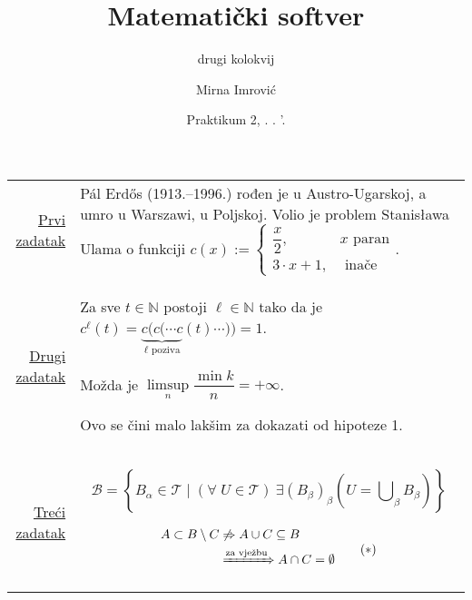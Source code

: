 \documentclass[10pt]{scrartcl}
\begin{document}


\renewcommand{\today}{\the\day. \MakeUppercase{\romannumeral\month}. '\StrGobbleLeft{\the\year}{2}.} %
\title{Matematički softver}
\subtitle{drugi kolokvij}
\date{Praktikum 2, \today}
\author{Mirna Imrović}

\maketitle

\begin{tabular}[width=\textwidth]{r @{:\ } p{}}
    \underline{Prvi zadatak} & 
    P\'al Erd\H{o}s (1913.--1996.) rođen je u Austro-Ugarskoj, a umro u Warszawi, u Poljskoj. Volio je problem Stanis\l{}awa Ulama o funkciji
    $c(x) := 
    \begin{cases}  
    \dfrac{x}{2}, & x\text{ paran}\\
    3\cdot x+1, & \text{ inače}
    \end{cases}.$ 
    \bigskip\\
    \underline{Drugi zadatak} & 
    \begin{hipoteza}
    Za sve $t\in\mathbb N$ postoji $\ell\in\mathbb N$ tako da je $c^\ell(t)= \underbrace{c\big(c(\cdots c}_{\ell\text{ poziva}}(t)\cdots )\big)=1$.
    \end{hipoteza}
    
    \begin{pokusaj}
     Možda je $\limsup\limits_n\dfrac{\min k}{n}=+\infty$.
    \end{pokusaj}
    
    Ovo se čini malo lakšim za dokazati od hipoteze 1.
    \bigskip\\
    
    \underline{Treći zadatak} &
    \[
    \mathcal B = 
    \left\{B_\alpha\in\mathcal T \mid (\forall\;U \in \mathcal T)\ \exists (B_\beta)_\beta 
    \left(U=\bigcup\nolimits_\beta B_\beta\right)
    \right\}
    \]
    
    \begin{equation}
        \begin{aligned}
            A\subset B\setminus C
            &\not\Rightarrow A\cup C \subseteq B\\
            & \xRightarrow[]{\text{za vježbu}} A\cap C = \emptyset %
        \end{aligned} \tag{$\ast$}
    \end{equation}
\end{tabular}
\end{document}
